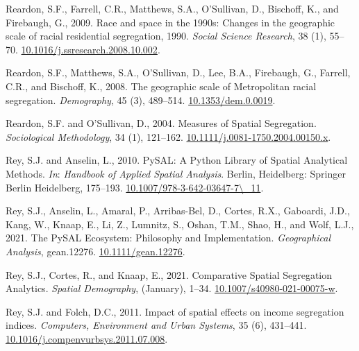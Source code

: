 \documentclass[
  10pt,
]{article}
\newlength{\cslhangindent}
\newenvironment{CSLReferences}[2] %
 {%
  \setlength{\parindent}{0pt}
  \ifodd #1 \everypar{\setlength{\hangindent}{\cslhangindent}}\ignorespaces\fi
  \ifnum #2 > 0
  \setlength{\parskip}{#2\baselineskip}
  \fi
 }%
 {}
\begin{document}
\begin{CSLReferences}{1}{0}
\leavevmode{}%
Reardon, S.F., Farrell, C.R., Matthews, S.A., O'Sullivan, D., Bischoff,
K., and Firebaugh, G., 2009. Race and space in the 1990s: {Changes} in
the geographic scale of racial residential segregation,
1990. \emph{Social Science Research}, 38 (1), 55--70.
\href{https://doi.org/10.1016/j.ssresearch.2008.10.002}{10.1016/j.ssresearch.2008.10.002}.

\leavevmode{}%
Reardon, S.F., Matthews, S.A., O'Sullivan, D., Lee, B.A., Firebaugh, G.,
Farrell, C.R., and Bischoff, K., 2008. The geographic scale of
{Metropolitan} racial segregation. \emph{Demography}, 45 (3), 489--514.
\href{https://doi.org/10.1353/dem.0.0019}{10.1353/dem.0.0019}.

\leavevmode{}%
Reardon, S.F. and O'Sullivan, D., 2004. Measures of {Spatial
Segregation}. \emph{Sociological Methodology}, 34 (1), 121--162.
\href{https://doi.org/10.1111/j.0081-1750.2004.00150.x}{10.1111/j.0081-1750.2004.00150.x}.

\leavevmode{}%
Rey, S.J. and Anselin, L., 2010. {PySAL}: {A Python Library} of {Spatial
Analytical Methods}. \emph{In}: \emph{Handbook of {Applied Spatial
Analysis}}. {Berlin, Heidelberg}: {Springer Berlin Heidelberg},
175--193.
\href{https://doi.org/10.1007/978-3-642-03647-7/_11}{10.1007/978-3-642-03647-7\textbackslash\_11}.

\leavevmode{}%
Rey, S.J., Anselin, L., Amaral, P., Arribas-Bel, D., Cortes, R.X.,
Gaboardi, J.D., Kang, W., Knaap, E., Li, Z., Lumnitz, S., Oshan, T.M.,
Shao, H., and Wolf, L.J., 2021. The {PySAL Ecosystem}: {Philosophy} and
{Implementation}. \emph{Geographical Analysis}, gean.12276.
\href{https://doi.org/10.1111/gean.12276}{10.1111/gean.12276}.

\leavevmode{}%
Rey, S.J., Cortes, R., and Knaap, E., 2021. Comparative {Spatial
Segregation Analytics}. \emph{Spatial Demography}, (January), 1--34.
\href{https://doi.org/10.1007/s40980-021-00075-w}{10.1007/s40980-021-00075-w}.

\leavevmode{}%
Rey, S.J. and Folch, D.C., 2011. Impact of spatial effects on income
segregation indices. \emph{Computers, Environment and Urban Systems}, 35
(6), 431--441.
\href{https://doi.org/10.1016/j.compenvurbsys.2011.07.008}{10.1016/j.compenvurbsys.2011.07.008}.


\end{CSLReferences}
\end{document}
